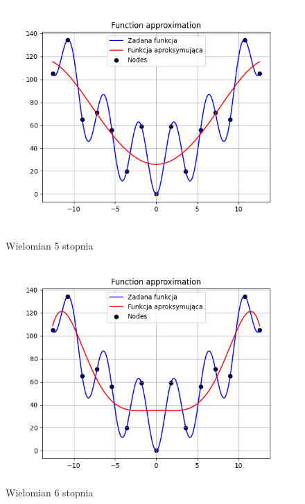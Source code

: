 \documentclass{article}
\begin{document}
\begin{figure}[H]
  \begin{minipage}[b]{0.49\textwidth}
    \begin{minipage}[b]{\textwidth}
      \includegraphics[width=\textwidth]{img11.png}
      \caption{Wielomian 5 stopnia}
    \end{minipage}
    \vspace*{\fill}
    \begin{minipage}[b]{\textwidth}
      \includegraphics[width=\textwidth]{img12.png}
      \caption{Wielomian 6 stopnia}
    \end{minipage}
  \end{minipage}
  \hfill
  \begin{minipage}[b]{0.49\textwidth}

\end{minipage}
\end{figure}
\end{document}
